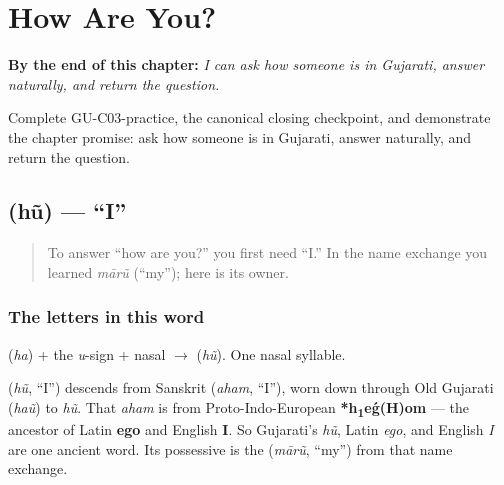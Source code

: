 
\chapter{How Are You?}
\label{ch:responding}

\begin{chapteropening}
\textbf{By the end of this chapter:} \emph{I can ask how someone is in Gujarati, answer naturally, and return the question.}

Complete GU-C03-practice, the canonical closing checkpoint, and demonstrate the chapter promise: ask how someone is in Gujarati, answer naturally, and return the question.
\end{chapteropening}

\section[\gu{હું}]{ (hũ) — \textquotedblleft{}I\textquotedblright{}}

\label{lesson:GU-C03-hun}



\begin{quote}
To answer \textquotedblleft{}how are you?\textquotedblright{} you first need \textquotedblleft{}I.\textquotedblright{} In the name exchange you learned \emph{mārũ} (\textquotedblleft{}my\textquotedblright{}); here is its owner.
\end{quote}

\subsection*{The letters in this word}
\textbf{} (\emph{ha}) + the \emph{u}-sign + nasal $\to$ \textbf{} (\emph{hũ}). One nasal syllable.

\begin{cousinweb}
\textbf{} (\emph{hũ}, \textquotedblleft{}I\textquotedblright{}) descends from Sanskrit \textbf{} (\emph{aham}, \textquotedblleft{}I\textquotedblright{}), worn down through Old Gujarati (\emph{haũ}) to \emph{hũ}. That \emph{aham} is from Proto-Indo-European \textbf{*h\textsubscript{1}eǵ(H)om} — the ancestor of Latin \textbf{ego} and English \textbf{I}. So Gujarati's \emph{hũ}, Latin \emph{ego}, and English \emph{I} are one ancient word. Its possessive is the \textbf{} (\emph{mārũ}, \textquotedblleft{}my\textquotedblright{}) from that name exchange.
\end{cousinweb}

